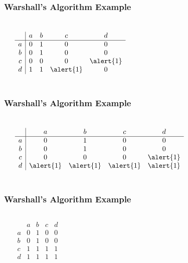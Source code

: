 \documentclass[dvipsnames]{beamer}
\begin{document}
\begin{frame}
  \frametitle{Warshall's Algorithm Example}

  \begin{columns}
    \begin{center}
    \end{center}

    \[
      \begin{array}{c|cccc}
            & a & b & c & d\\\hline
          a & 0 & 1 & 0 & 0\\
          b & 0 & 1 & 0 & 0\\
          c & 0 & 0 & 0 & \alert{1}\\
          d & 1 & 1 & \alert{1} & 0
      \end{array}
    \]
  \end{columns}
\end{frame}

\begin{frame}
  \frametitle{Warshall's Algorithm Example}

  \begin{columns}
    \begin{center}
    \end{center}

    \[
      \begin{array}{c|cccc}
            & a & b & c & d\\\hline
          a & 0 & 1 & 0 & 0\\
          b & 0 & 1 & 0 & 0\\
          c & 0 & 0 & 0 & \alert{1}\\
          d & \alert{1} & \alert{1} & \alert{1} & \alert{1}
      \end{array}
    \]
  \end{columns}
\end{frame}

\begin{frame}
  \frametitle{Warshall's Algorithm Example}

  \begin{columns}
    \begin{center}
    \end{center}

    \[
      \begin{array}{c|cccc}
            & a & b & c & d\\\hline
          a & 0 & 1 & 0 & 0\\
          b & 0 & 1 & 0 & 0\\
          c & 1 & 1 & 1 & 1\\
          d & 1 & 1 & 1 & 1
      \end{array}
    \]
  \end{columns}
\end{frame}
\end{document}
